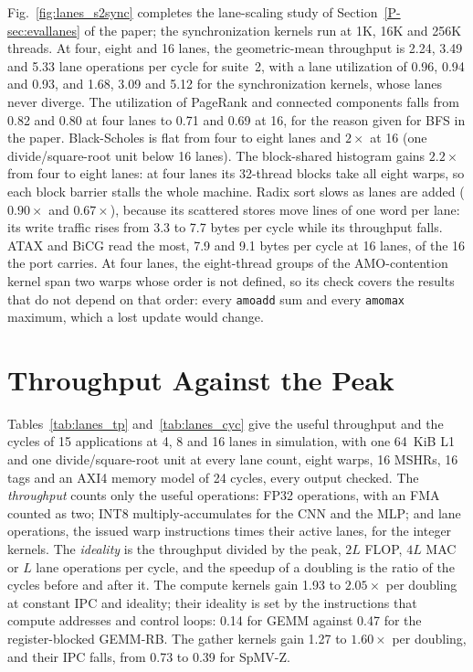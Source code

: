 Fig.~\ref{fig:lanes_s2sync} completes the lane-scaling study of
Section~\ref{P-sec:evallanes} of the paper; the synchronization kernels run at 1K, 16K
and 256K threads. At four, eight and 16 lanes, the geometric-mean throughput is 2.24,
3.49 and 5.33 lane operations per cycle for suite~2, with a lane utilization of 0.96,
0.94 and 0.93, and 1.68, 3.09 and 5.12 for the synchronization kernels, whose lanes
never diverge. The utilization of PageRank and connected components falls from 0.82
and 0.80 at four lanes to 0.71 and 0.69 at 16, for the reason given for BFS in the
paper. Black-Scholes is flat from four to eight
lanes and $2\times$ at 16 (one divide/square-root unit below 16 lanes). The block-shared
histogram gains $2.2\times$ from four to eight lanes: at four lanes its 32-thread blocks
take all eight warps, so each block barrier stalls the whole machine. Radix sort slows
as lanes are added ($0.90\times$ and $0.67\times$), because its scattered stores move
lines of one word per lane: its write traffic rises from 3.3 to 7.7 bytes per cycle
while its throughput falls. ATAX and BiCG read the most, 7.9 and 9.1 bytes per cycle at
16 lanes, of the 16 the port carries. At four lanes, the eight-thread groups of the AMO-contention
kernel span two warps whose order is not defined, so its check covers the results that
do not depend on that order: every \texttt{amoadd} sum and every \texttt{amomax}
maximum, which a lost update would change.

\section{Throughput Against the Peak}\label{sup:lanestp}
Tables~\ref{tab:lanes_tp} and~\ref{tab:lanes_cyc} give the useful throughput and the
cycles of 15 applications at 4, 8 and 16 lanes in simulation, with one 64~KiB L1 and one
divide/square-root unit at every lane count, eight warps, 16 MSHRs, 16 tags and an AXI4
memory model of 24 cycles, every output checked. The \emph{throughput} counts only the
useful operations: FP32 operations, with an FMA counted as two; INT8
multiply-accumulates for the CNN and the MLP; and lane operations, the issued warp
instructions times their active lanes, for the integer kernels. The \emph{ideality} is
the throughput divided by the peak, $2L$ FLOP, $4L$ MAC or $L$ lane operations per
cycle, and the speedup of a doubling is the ratio of the cycles before and after it. The compute kernels gain 1.93 to $2.05\times$ per doubling at constant IPC and
ideality; their ideality is set by the instructions that compute addresses and control
loops: 0.14 for GEMM against 0.47 for the register-blocked GEMM-RB. The gather kernels
gain 1.27 to $1.60\times$ per doubling, and their IPC falls, from 0.73 to 0.39 for
SpMV-Z.

